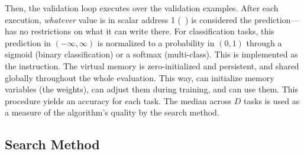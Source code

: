 Then, the validation loop executes \predict over the validation examples. After each \predict execution, \textit{whatever} value is in scalar address 1 (\ie{}~) is considered the prediction---\predict has no restrictions on what it can write there. For classification tasks, this prediction in $(-\infty,\infty)$ is normalized to a probability in $(0, 1)$ through a sigmoid (binary classification) or a softmax (multi-class). This is implemented as the  instruction.
The virtual memory is zero-initialized and persistent, and shared globally throughout the whole evaluation. This way, \setup can initialize memory variables (\eg the weights), \learn can adjust them during training, and \predict can use them. This procedure yields an accuracy for each task. The median across $D$ tasks is used as a measure of the algorithm's quality by the search method.

\subsection {Search Method}
\label{methods_search_sec}

